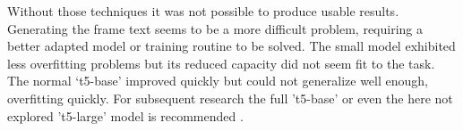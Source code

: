 \documentclass[11pt,a4paper,onecolumn,oneside,notitlepage]{article}
\begin{document}
Without those techniques it was not possible to produce usable results. Generating the frame text seems to be a more difficult problem, requiring a better adapted model or training routine to be solved. The small model exhibited less overfitting problems but its reduced capacity did not seem fit to the task. The normal ‘t5-base’ improved quickly but could not generalize well enough, overfitting quickly. For subsequent research the full 't5-base' or even the here not explored 't5-large' model is recommended .



\printbibliography
\end{document}
